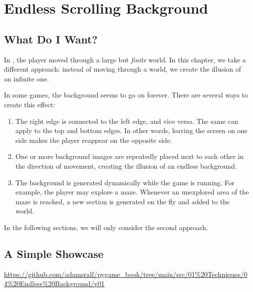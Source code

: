 \newpage
\section{Endless Scrolling Background}\label{secEndlessScrolling}

\subsection{What Do I Want?}

In , the player moved through a large but \emph{finite} world. In this chapter, we take a different approach: instead of moving through a world, we create the illusion of an infinite one.

In some games, the background seems to go on forever. There are several ways to create this effect:

\begin{enumerate}
	\item The right edge is connected to the left edge, and vice versa. The same can apply to the top and bottom edges. In other words, leaving the screen on one side makes the player reappear on the opposite side.
	
	\item One or more background images are repeatedly placed next to each other in the direction of movement, creating the illusion of an endless background.
	
	\item The background is generated dynamically while the game is running. For example, the player may explore a maze. Whenever an unexplored area of the maze is reached, a new section is generated on the fly and added to the world.
	
\end{enumerate}

In the following sections, we will only consider the second approach.

\subsection{A Simple Showcase}

\begin{diskbox}
	\url{https://github.com/adamsralf/pygame_book/tree/main/src/01%20Techniques/04%20Endless%20Background/v01}
\end{diskbox}


